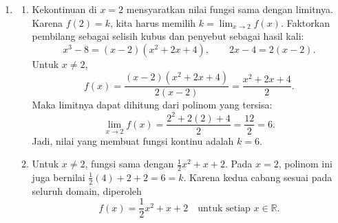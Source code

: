 \documentclass[10pt,letterpaper]{article}
\newcommand{\R}{\mathbb{R}}
\begin{document}
\begin{enumerate}
\begin{enumerate}
          \item Masukkan $g(x)$ ke fungsi $f$:
                \[
                  (f\circ g)(x)=f(g(x))
                  =\frac1{g(x)-1}=\frac1{2-\sqrt{x}-1}
                  =\boxed{\frac1{1-\sqrt{x}}}.
                \]
                Domain komposisi harus memenuhi dua syarat.
                Fungsi dalam $g(x)$ harus terdefinisi, sehingga $x\ge0$.
                Hasil $g(x)$ juga harus berada dalam domain $f$, sehingga $g(x)\ne1$.
                Nilai yang membuat syarat kedua gagal adalah
                \[
                  2-\sqrt{x}=1\iff\sqrt{x}=1\iff x=1.
                \]
                Jadi, ambil semua $x\ge0$, lalu keluarkan $x=1$:
                \[
                  \boxed{D_{f\circ g}=[0,1)\cup(1,\infty)}.
                \]
                Nilai $0$ tetap termasuk karena penyebutnya $1-\sqrt0=1\ne0$.
        \end{enumerate}

        \newpage

  \item \begin{enumerate}
          \item Kekontinuan di $x=2$ mensyaratkan nilai fungsi sama dengan limitnya.
                Karena $f(2)=k$, kita harus memilih $k=\lim_{x\to2}f(x)$.
                Faktorkan pembilang sebagai selisih kubus dan penyebut sebagai hasil kali:
                \[
                  x^3-8=(x-2)(x^2+2x+4),\qquad 2x-4=2(x-2).
                \]
                Untuk $x\ne2$,
                \[
                  f(x)=\frac{(x-2)(x^2+2x+4)}{2(x-2)}
                  =\frac{x^2+2x+4}{2}.
                \]
                Maka limitnya dapat dihitung dari polinom yang tersisa:
                \[
                  \lim_{x\to2}f(x)=\frac{2^2+2(2)+4}{2}
                  =\frac{12}{2}=6.
                \]
                Jadi, nilai yang membuat fungsi kontinu adalah $\boxed{k=6}$.

          \item Untuk $x\ne2$, fungsi sama dengan $\frac12x^2+x+2$.
                Pada $x=2$, polinom ini juga bernilai $\frac12(4)+2+2=6=k$.
                Karena kedua cabang sesuai pada seluruh domain, diperoleh
                \[
                  \boxed{f(x)=\frac12x^2+x+2\quad\text{untuk setiap }x\in\R}.
                \]
        \end{enumerate}


\end{enumerate}
\end{document}
